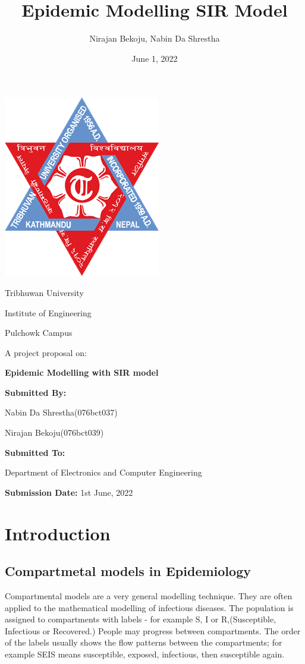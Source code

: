 \documentclass[a4paper, 12pt]{article}
\title{Epidemic Modelling SIR Model}
\author{Nirajan Bekoju, Nabin Da Shrestha}
\date{June 1, 2022}
\begin{document}
  
\begin{center}
\includegraphics[scale = 0.5]{logo.png}


Tribhuwan University

Institute of Engineering

Pulchowk Campus

\noindent\makebox[\linewidth]
{\rule{15cm}{0.4pt}}
A project proposal on:

\textbf{\large Epidemic Modelling with SIR model}
\noindent\makebox[\linewidth]
{\rule{15cm}{0.4pt}}

\bigskip
\textbf{Submitted By:}

Nabin Da Shrestha(076bct037)

Nirajan Bekoju(076bct039)

\bigskip
\bigskip
\textbf{Submitted To:}

Department of Electronics and Computer Engineering

\bigskip
\bigskip
\textbf{Submission Date:} 1st June, 2022
\end{center}
\clearpage

\tableofcontents
\clearpage

\section{Introduction}
\subsection{Compartmetal models in Epidemiology}
Compartmental models are a very general modelling technique. They are often applied to the mathematical modelling of infectious diseases. The population is assigned to compartments with labels - for example S, I or R,(Susceptible, Infectious or Recovered.) People may progress between compartments. The order of the labels usually shows the flow patterns between the compartments; for example SEIS means susceptible, exposed, infectious, then susceptible again.
\end{document}
